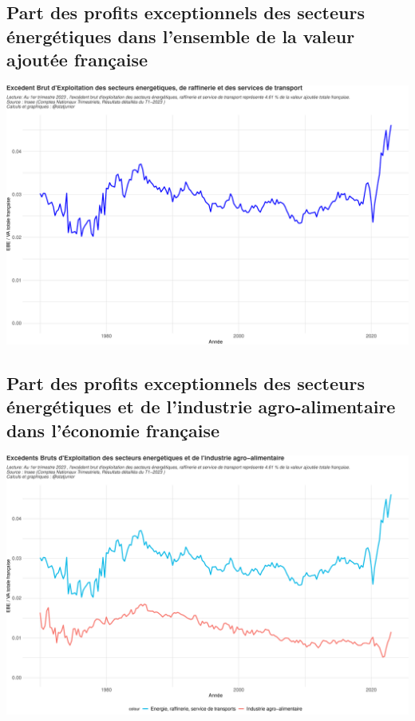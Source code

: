 \documentclass[
  paper=a4,
  ,captions=tableheading
]{scrartcl}
\begin{document}
\hypertarget{part-des-profits-exceptionnels-des-secteurs-uxe9nerguxe9tiques-dans-lensemble-de-la-valeur-ajoutuxe9e-franuxe7aise}{%
\subsection{Part des profits exceptionnels des secteurs énergétiques
dans l'ensemble de la valeur ajoutée
française}\label{part-des-profits-exceptionnels-des-secteurs-uxe9nerguxe9tiques-dans-lensemble-de-la-valeur-ajoutuxe9e-franuxe7aise}}

\includegraphics{rapport_pdf_compte_branche_files/figure-latex/unnamed-chunk-34-1.pdf}

\hypertarget{part-des-profits-exceptionnels-des-secteurs-uxe9nerguxe9tiques-et-de-lindustrie-agro-alimentaire-dans-luxe9conomie-franuxe7aise}{%
\subsection{Part des profits exceptionnels des secteurs énergétiques et
de l'industrie agro-alimentaire dans l'économie
française}\label{part-des-profits-exceptionnels-des-secteurs-uxe9nerguxe9tiques-et-de-lindustrie-agro-alimentaire-dans-luxe9conomie-franuxe7aise}}

\includegraphics{rapport_pdf_compte_branche_files/figure-latex/unnamed-chunk-35-1.pdf}
\end{document}
